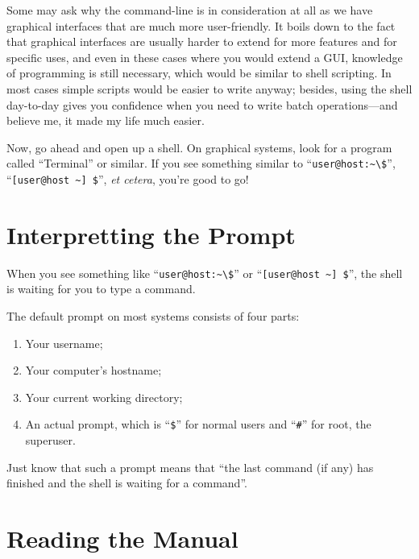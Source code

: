 \documentclass{extbook}
\begin{document}
Some may ask why the command-line is in consideration at all as we have graphical interfaces that are much more user-friendly.  It boils down to the fact that graphical interfaces are usually harder to extend for more features and for specific uses, and even in these cases where you would extend a GUI, knowledge of programming is still necessary, which would be similar to shell scripting.  In most cases simple scripts would be easier to write anyway; besides, using the shell day-to-day gives you confidence when you need to write batch operations---and believe me, it made my life much easier.

Now, go ahead and open up a shell.  On graphical systems, look for a program called ``Terminal'' or similar.  If you see something similar to ``\verb|user@host:~\$|'', ``\verb|[user@host ~] $|'', \textit{et cetera}, you're good to go!

\section{Interpretting the Prompt}

When you see something like ``\verb|user@host:~\$|'' or ``\verb|[user@host ~] $|'', the shell is waiting for you to type a command.

The default prompt on most systems consists of four parts:
\begin{enumerate}
	\item Your username;
	\item Your computer's hostname;
	\item Your current working directory;
	\item An actual prompt, which is ``\verb|$|'' for normal users and ``\verb|#|'' for root, the superuser.
\end{enumerate}


Just know that such a prompt means that ``the last command (if any) has finished and the shell is waiting for a command''.

\section{Reading the Manual}
\end{document}
